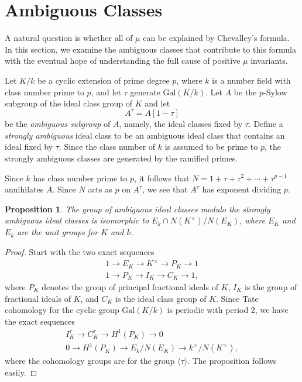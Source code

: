 \documentclass{amsart}
\newtheorem{proposition}[theorem]{Proposition}
\begin{document}
\section{Ambiguous Classes}\label{SectAmbig}

A natural question is whether all of $\mu$ can be explained by Chevalley's formula. In this section, we examine the
ambiguous classes that contribute to this formula with the eventual hope of understanding the full cause of positive $\mu$ invariants.

Let $K/k$ be a cyclic extension of prime degree $p$, where $k$ is a number field with class number prime to $p$,
and let $\tau$ generate $\text{Gal}(K/k)$. Let $A$ be the $p$-Sylow subgroup of the ideal class group of $K$
and let
$$
A^{\tau} = A[1-\tau]
$$
be the {\it ambiguous subgroup} of $A$, namely, the ideal classes fixed by $\tau$. Define a {\it strongly 
ambiguous} ideal class to be an ambiguous ideal class that contains an ideal fixed by $\tau$.
Since the class number of $k$ is assumed to be prime to $p$, the strongly ambiguous classes are generated
by the ramified primes.

Since $k$ has class number prime to $p$, it follows that $N=1+\tau+\tau^2+\cdots +\tau^{p-1}$ annihilates $A$.
Since $N$ acts as $p$ on $A^{\tau}$, we see that $A^{\tau}$ has exponent dividing $p$.

\begin{proposition}\label{ambig} The group of ambiguous ideal classes modulo the strongly ambiguous ideal classes
is isomorphic to $E_k \cap N(K^{\times})/N(E_K)$, where $E_K$ and $E_k$ are the unit groups for $K$ and $k$.
\end{proposition}
\begin{proof}  Start with the two exact sequences
\begin{gather*}
1\to E_K\to K^{\times} \to P_K\to 1\\
1\to P_K \to I_K \to C_K\to 1,
\end{gather*}
where $P_K$ denotes the group of principal fractional ideals of $K$, $I_K$ is the group of fractional ideals
of $K$, and $C_K$ is the ideal class group of $K$. 
Since Tate cohomology for the cyclic group $\text{Gal}(K/k)$ is periodic with period 2,
we have the exact sequences
\begin{gather*}
I_K^{\tau} \to C_K^{\tau} \to H^1(P_K) \to 0\\
0\to H^1(P_K) \to E_k/N(E_K) \to k^{\times}/N(K^{\times}),
\end{gather*}
where the cohomology groups are for the group $\langle \tau\rangle$. 
The proposition follows easily. \end{proof}
\end{document}
